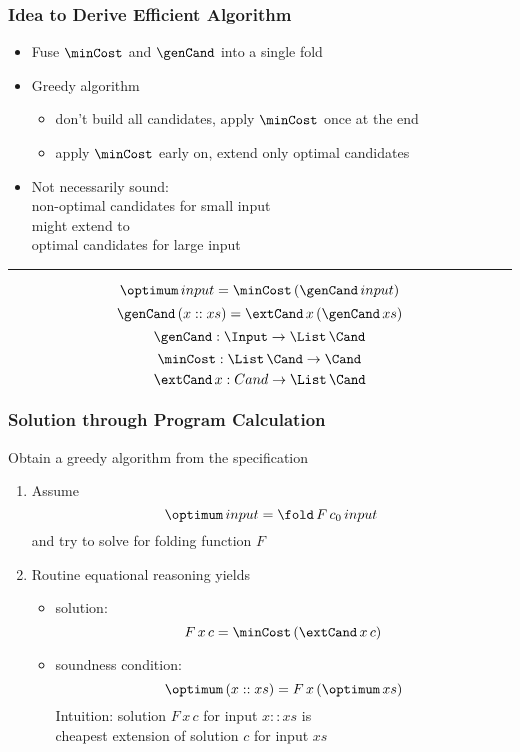 \documentclass{beamer}
\def\inp{input}
\begin{document}
\begin{frame}\frametitle{Idea to Derive Efficient Algorithm}
\begin{itemize}
\item Fuse $\minCost$ and $\genCand$ into a single fold
\item Greedy algorithm
\begin{itemize}
\item don't build all candidates, apply $\minCost$ once at the end
\item apply $\minCost$ early on, extend only optimal candidates
\end{itemize}
\item Not necessarily sound:\\
   \tb non-optimal candidates for small input \\
   \tb might extend to \\
   \tb optimal candidates for large input
\end{itemize}

\hrule
\color{gray}
\[\optimum\,\inp = \minCost\,(\genCand\,\inp)\]
\[\genCand\, (x::xs) = \extCand\, x\,(\genCand\,xs)\]
\[\genCand: \Input\to \List\, \Cand\]
\[\minCost: \List\, \Cand \to \Cand\]
\[\extCand\,x: Cand \to \List\,\Cand\]
\end{frame}

\begin{frame}\frametitle{Solution through Program Calculation}
Obtain a greedy algorithm from the specification
\begin{enumerate}
\item Assume \[\optimum\,\inp = \fold\, F\,c_0\,\inp\]
and try to solve for folding function $F$
\item<2-> Routine equational reasoning yields
\begin{itemize}
  \item solution:
    \[F\,x\,c = \minCost\,(\extCand\,x\,c)\]
  \item soundness condition:
    \[\optimum\,(x::xs) = F\,x\,(\optimum\,xs)\]
Intuition: solution $F\,x\,c$ for input $x::xs$ is \\ cheapest extension of solution $c$ for input $xs$
\end{itemize}
\end{enumerate}
\end{frame}
\end{document}

